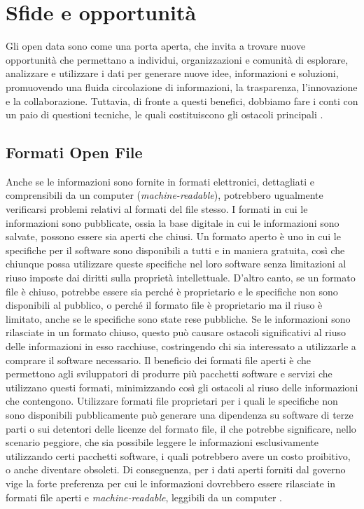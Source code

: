 \section{Sfide e opportunità}   %
Gli open data sono come una porta aperta, che invita a trovare nuove opportunità che permettano a individui, organizzazioni e comunità di esplorare, analizzare e utilizzare i dati per generare nuove idee, informazioni e soluzioni, promuovendo una fluida circolazione di informazioni, la trasparenza, l'innovazione e la collaborazione. Tuttavia, di fronte a questi benefici, dobbiamo fare i conti con un paio di questioni tecniche, le quali costituiscono gli ostacoli principali \cite{Open_Data_Opportunità}.

\subsection{Formati Open File}
Anche se le informazioni sono fornite in formati elettronici, dettagliati e comprensibili da un computer (\textit{machine-readable}), potrebbero ugualmente verificarsi problemi relativi al formati del file stesso. I formati in cui le informazioni sono pubblicate, ossia la base digitale in cui le informazioni sono salvate, possono essere sia aperti che chiusi. Un formato aperto è uno in cui le specifiche per il software sono disponibili a tutti e in maniera gratuita, così che chiunque possa utilizzare queste specifiche nel loro software senza limitazioni al riuso imposte dai diritti sulla proprietà intellettuale. D'altro canto, se un formato file è chiuso, potrebbe essere sia perché è proprietario e le specifiche non sono disponibili al pubblico, o perché il formato file è proprietario ma il riuso è limitato, anche se le specifiche sono state rese pubbliche. Se le informazioni sono rilasciate in un formato chiuso, questo può causare ostacoli significativi al riuso delle informazioni in esso racchiuse, costringendo chi sia interessato a utilizzarle a comprare il software necessario. Il beneficio dei formati file aperti è che permettono agli sviluppatori di produrre più pacchetti software e servizi che utilizzano questi formati, minimizzando così gli ostacoli al riuso delle informazioni che contengono. Utilizzare formati file proprietari per i quali le specifiche non sono disponibili pubblicamente può generare una dipendenza su software di terze parti o sui detentori delle licenze del formato file, il che potrebbe significare, nello scenario peggiore, che sia possibile leggere le informazioni esclusivamente utilizzando certi pacchetti software, i quali potrebbero avere un costo proibitivo, o anche diventare obsoleti. Di conseguenza, per i dati aperti forniti dal governo vige la forte preferenza per cui le informazioni dovrebbero essere rilasciate in formati file aperti e \textit{machine-readable}, leggibili da un computer \cite{OpenDataHandbook_FileFormats}.

